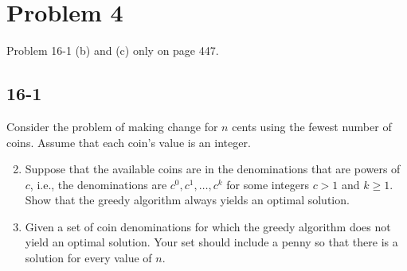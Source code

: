 \documentclass{../../class}
\begin{document}
\newpage
\section*{Problem 4}
\begin{tcolorbox}
    Problem 16-1 (b) and (c) only on page 447.
\end{tcolorbox}
\subsection*{16-1}
Consider the problem of making change for $n$ cents using the fewest number of coins. Assume that each coin's value is an integer.
\begin{enumerate}[label=\textbf{\textit{\alph*}}.]
    \setcounter{enumi}{1}
    \item Suppose that the available coins are in the denominations that are powers of $c$, i.e., the denominations are $c^0, c^1, \dots, c^k$ for some integers $c > 1$ and $k \geq 1$. Show that the greedy algorithm always yields an optimal solution.
    \item Given a set of coin denominations for which the greedy algorithm does not yield an optimal solution. Your set should include a penny so that there is a solution for every value of $n$.
\end{enumerate}

\newpage
\end{document}
